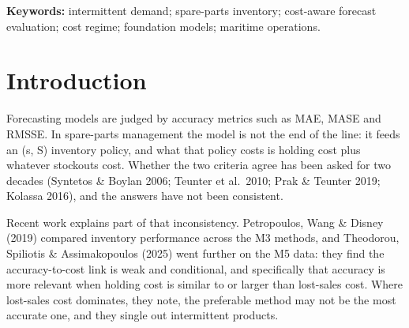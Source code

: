 \documentclass[11pt]{article}
\begin{document}
\begin{abstract}
and then only by scoring at the fractile the decision actually reads, since a
generic distributional score performs worse than MAE. Finally we test
generality on the public M5 data and it does not transfer: the analytic
condition holds for 10.1 \% of M5 series against 77.3 \% here, and the
confound is correspondingly mild. The severity is therefore a measurable
property of the evaluation window rather than of intermittency, and that
reconciles why competition-data and spare-parts studies disagree. Two secondary results: a
zero-shot Chronos-T5 model is the most accurate and the cheapest forecaster in
the set, and ten of the eleven model-driven policies beat the deployed
parameterisation on cost, though our simulator is not validated against
realised stockouts so we report that direction without its magnitude. We also
report a negative result. Scoring against right-censored quarters, which is a
real feature of this data, does not reorder the forecasters at all. The
anonymised data and the full pipeline are released.
\end{abstract}

\noindent\textbf{Keywords:} intermittent demand; spare-parts inventory;
cost-aware forecast evaluation; cost regime; foundation models; maritime
operations.

\section{Introduction}

Forecasting models are judged by accuracy metrics such as MAE, MASE and RMSSE.
In spare-parts management the model is not the end of the line: it feeds an
(s, S) inventory policy, and what that policy costs is holding cost plus
whatever stockouts cost. Whether the two criteria agree has been asked for two
decades (Syntetos \& Boylan 2006; Teunter et al.\ 2010; Prak \& Teunter 2019;
Kolassa 2016), and the answers have not been consistent.

Recent work explains part of that inconsistency. Petropoulos, Wang \& Disney
(2019) compared inventory performance across the M3 methods, and Theodorou,
Spiliotis \& Assimakopoulos (2025) went further on the M5 data: they find the
accuracy-to-cost link is weak and conditional, and specifically that accuracy
is more relevant when holding cost is similar to or larger than lost-sales
cost. Where lost-sales cost dominates, they note, the preferable method may not
be the most accurate one, and they single out intermittent products.
\end{document}
